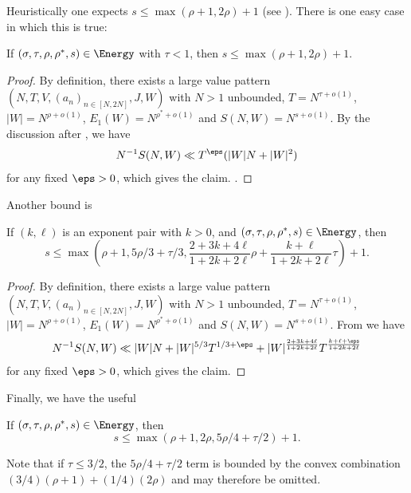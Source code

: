 Heuristically one expects $s \leq \max( \rho+1, 2\rho)+1$ (see \cite[(11.63)]{ivic}).  There is one easy case in which this is true:

\begin{lemma}\label{easy-double-zeta-bound}  If $(\sigma,\tau,\rho,\rho^*,s) \in \Energy$ with $\tau < 1$, then $s \leq \max(\rho+1, 2\rho)+1$.
\end{lemma}

\literature
{}

\begin{proof} By definition, there exists a large value pattern $(N,T,V,(a_n)_{n \in [N,2N]},J,W)$ with $N>1$ unbounded, $T = N^{\tau+o(1)}$, $|W| = N^{\rho+o(1)}$, $E_1(W) = N^{\rho^*+o(1)}$ and $S(N,W) = N^{s+o(1)}$.  By the discussion after \cite[(11.63)]{ivic}, we have
    $$ N^{-1} S(N,W) \ll T^\eps ( |W| N + |W|^2 )$$
for any fixed $\eps>0$, which gives the claim.    .
\end{proof}

Another bound is

\begin{lemma}\label{double-zeta-from-exp-pair}\cite[Lemma 11.2]{ivic}  If $(k,\ell)$ is an exponent pair with $k>0$, and $(\sigma,\tau,\rho,\rho^*,s) \in \Energy$, then
$$ s \leq \max\left( \rho+1, 5\rho/3 + \tau/3, \frac{2+3k+4\ell}{1+2k+2\ell} \rho + \frac{k+\ell}{1+2k+2\ell} \tau\right) + 1.$$
\end{lemma}

\begin{proof} By definition, there exists a large value pattern $(N,T,V,(a_n)_{n \in [N,2N]},J,W)$ with $N>1$ unbounded, $T = N^{\tau+o(1)}$, $|W| = N^{\rho+o(1)}$, $E_1(W) = N^{\rho^*+o(1)}$ and $S(N,W) = N^{s+o(1)}$.   From \cite[Lemma 11.2]{ivic} we have
$$ N^{-1} S(N,W) \ll |W| N + |W|^{5/3} T^{1/3+\eps} + |W|^{\frac{2+3k+4\ell}{1+2k+2\ell}} T^{\frac{k+\ell+\eps}{1+2k+2\ell}}$$
for any fixed $\eps>0$, which gives the claim.
\end{proof}

Finally, we have the useful

\begin{lemma}\label{hb-double}  If $(\sigma,\tau,\rho,\rho^*,s) \in \Energy$, then
    $$ s \leq \max( \rho+1, 2\rho, 5\rho/4+\tau/2) + 1.$$
\end{lemma}

Note that if $\tau \leq 3/2$, the $5\rho/4+\tau/2$ term is bounded by the convex combination $(3/4)(\rho+1)+(1/4)(2\rho)$ and may therefore be omitted.

